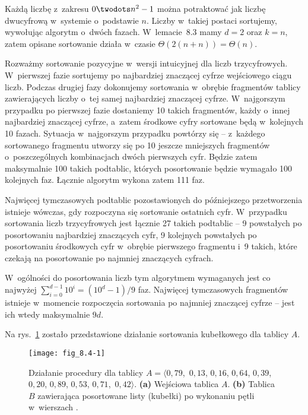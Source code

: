 \exercise %
Każdą liczbę z~zakresu $0\twodots n^2-1$ można potraktować jak liczbę dwucyfrową w~systemie o~podstawie $n$.
Liczby w~takiej postaci sortujemy, wywołując algorytm  o~dwóch fazach.
W~lemacie~8.3 mamy $d=2$ oraz $k=n$, zatem opisane sortowanie działa w~czasie $\Theta(2(n+n))=\Theta(n)$.

\exercise %
Rozważmy sortowanie pozycyjne w~wersji intuicyjnej dla liczb trzycyfrowych.
W~pierwszej fazie sortujemy po najbardziej znaczącej cyfrze wejściowego ciągu liczb.
Podczas drugiej fazy dokonujemy sortowania w~obrębie fragmentów tablicy zawierających liczby o~tej samej najbardziej znaczącej cyfrze.
W~najgorszym przypadku po pierwszej fazie dostaniemy 10 takich fragmentów, każdy o~innej najbardziej znaczącej cyfrze, a~zatem środkowe cyfry sortowane będą w~kolejnych 10 fazach.
Sytuacja w~najgorszym przypadku powtórzy się -- z~każdego sortowanego fragmentu utworzy się po 10 jeszcze mniejszych fragmentów o~poszczególnych kombinacjach dwóch pierwszych cyfr.
Będzie zatem maksymalnie 100 takich podtablic, których posortowanie będzie wymagało 100 kolejnych faz.
Łącznie algorytm wykona zatem 111 faz.


Najwięcej tymczasowych podtablic pozostawionych do późniejszego przetworzenia istnieje wówczas, gdy rozpoczyna się sortowanie ostatnich cyfr.
W~przypadku sortowania liczb trzycyfrowych jest łącznie 27 takich podtablic -- 9 powstałych po posortowaniu najbardziej znaczących cyfr, 9 kolejnych powstałych po posortowaniu środkowych cyfr w~obrębie pierwszego fragmentu i~9 takich, które czekają na posortowanie po najmniej znaczących cyfrach.

W~ogólności do posortowania liczb  tym algorytmem wymaganych jest co najwyżej $\sum_{i=0}^{d-1}10^i=(10^d-1)/9$ faz.
Najwięcej tymczasowych fragmentów istnieje w~momencie rozpoczęcia sortowania po najmniej znaczącej cyfrze -- jest ich wtedy maksymalnie $9d$.


\exercise %
Na rys.~\ref{fig:8.4-1} zostało przedstawione działanie sortowania kubełkowego dla tablicy $A$.
\begin{figure}[ht]
	\begin{center}
		\texttt{[image: fig\_8.4-1]}
	\end{center}
	\caption{Działanie procedury  dla tablicy $A=\langle0{,}79$,~$0{,}13$, $0{,}16$, $0{,}64$, $0{,}39$, $0{,}20$, $0{,}89$, $0{,}53$,\! $0{,}71$,\!~$0{,}42\rangle$.
{\sffamily\bfseries(a)} Wejściowa tablica $A$.
{\sffamily\bfseries(b)} Tablica $B$ zawierająca posortowane listy (kubełki) po wykonaniu pętli w~wierszach .} \label{fig:8.4-1}
\end{figure}

